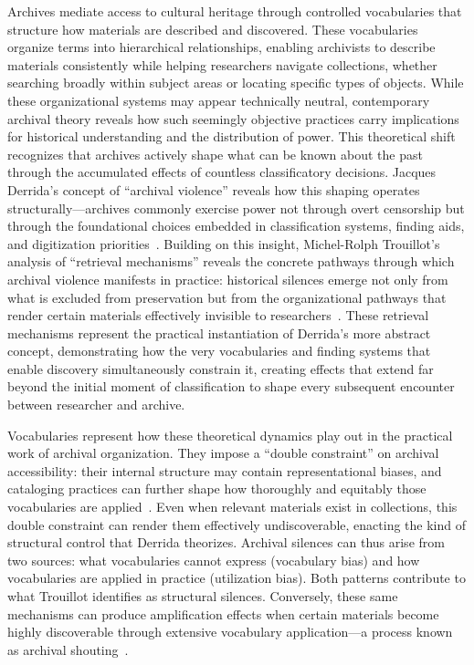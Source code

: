 \documentclass[final]{anthology-ch}
\begin{document}
 Archives mediate access to cultural heritage through controlled vocabularies that structure how materials are described and discovered. These vocabularies organize terms into hierarchical relationships, enabling archivists to describe materials consistently while helping researchers navigate collections, whether searching broadly within subject areas or locating specific types of objects. While these organizational systems may appear technically neutral, contemporary archival theory reveals how such seemingly objective practices carry implications for historical understanding and the distribution of power. This theoretical shift recognizes that archives actively shape what can be known about the past through the accumulated effects of countless classificatory decisions. Jacques Derrida's concept of ``archival violence'' reveals how this shaping operates structurally---archives commonly exercise power not through overt censorship but through the foundational choices embedded in classification systems, finding aids, and digitization priorities~\cite{derrida1996archive}. Building on this insight, Michel-Rolph Trouillot's analysis of ``retrieval mechanisms'' reveals the concrete pathways through which archival violence manifests in practice: historical silences emerge not only from what is excluded from preservation but from the organizational pathways that render certain materials effectively invisible to researchers~\cite{trouillotSilencingPowerProduction2015}. These retrieval mechanisms represent the practical instantiation of Derrida's more abstract concept, demonstrating how the very vocabularies and finding systems that enable discovery simultaneously constrain it, creating effects that extend far beyond the initial moment of classification to shape every subsequent encounter between researcher and archive.

Vocabularies represent how these theoretical dynamics play out in the practical work of archival organization. They impose a ``double constraint'' on archival accessibility: their internal structure may contain representational biases, and cataloging practices can further shape how thoroughly and equitably those vocabularies are applied~\cite{knowltonThreeDecadesPrejudices2005}. Even when relevant materials exist in collections, this double constraint can render them effectively undiscoverable, enacting the kind of structural control that Derrida theorizes. Archival silences can thus arise from two sources: what vocabularies cannot express (vocabulary bias) and how vocabularies are applied in practice (utilization bias). Both patterns contribute to what Trouillot identifies as structural silences. Conversely, these same mechanisms can produce amplification effects when certain materials become highly discoverable through extensive vocabulary application---a process known as archival shouting~\cite{wulfArchivalShoutingAHA2024}. 
\end{document}
